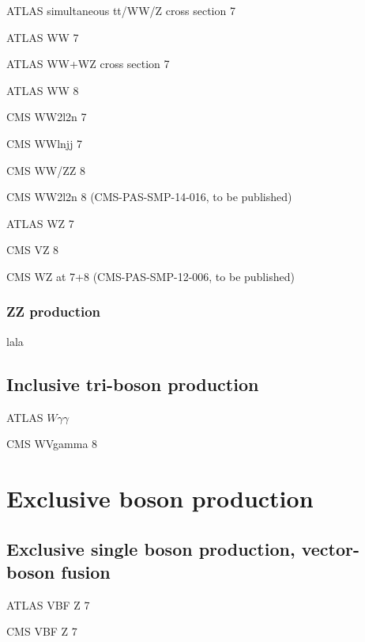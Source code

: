 \documentclass[12pt]{iopart}
\begin{document}
ATLAS simultaneous tt/WW/Z cross section 7 \TeV~\cite{Aad:2014jra}

ATLAS WW 7 \TeV~\cite{ATLAS:2012mec}

ATLAS WW+WZ cross section 7 \TeV~\cite{Aad:2014mda}

ATLAS WW 8 \TeV~\cite{ATLAS-CONF-2014-033}

CMS WW2l2n 7 \TeV~\cite{Chatrchyan:2013yaa}

CMS WWlnjj 7 \TeV~\cite{Chatrchyan:2012bd}

CMS WW/ZZ 8 \TeV~\cite{Chatrchyan:2013oev}

CMS WW2l2n 8 \TeV (CMS-PAS-SMP-14-016, to be published)


ATLAS WZ 7 \TeV~\cite{Aad:2012twa}

CMS VZ 8 \TeV~\cite{Chatrchyan:2014aqa}

CMS WZ at 7+8 \TeV (CMS-PAS-SMP-12-006, to be published)

\subsubsection{ZZ production}
\label{sss-ZZprod}

lala







\subsection{Inclusive tri-boson production}

ATLAS $W\gamma\gamma$~\cite{Aad:2015uqa}

CMS WVgamma 8 \TeV~\cite{Chatrchyan:2014bza}

\section{Exclusive boson production}
\subsection{Exclusive single boson production, vector-boson fusion}

ATLAS VBF Z 7 \TeV~\cite{Aad:2014dta}

CMS VBF Z 7 \TeV~\cite{Chatrchyan:2013jya}
\end{document}
